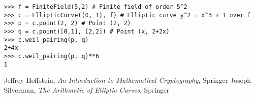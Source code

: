 \documentclass[a4paper]{article}
\begin{document}
\begin{lstlisting}[caption=Computing the Weil pairing]
>>> f = FiniteField(5,2) # Finite field of order 5^2
>>> c = EllipticCurve((0, 1), f) # Elliptic curve y^2 = x^3 + 1 over f
>>> p = c.point(2, 2) # Point (2, 2)
>>> q = c.point([0,1], [2,2]) # Point (x, 2+2x)
>>> c.weil_pairing(p, q)
2+4x
>>> c.weil_pairing(p, q)**6
1

\end{lstlisting}

\begin{thebibliography}{9}
	 Jeffrey Hoffstein, \emph{An Introduction to Mathematical Cryptography}, Springer
	 Joseph Silverman, \emph{The Arithmetic of Elliptic Curves}, Springer
\end{thebibliography}
\end{document}

